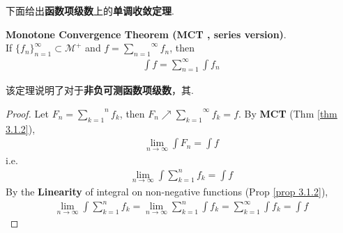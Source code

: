 	\newpage
	下面给出\textbf{函数项级数}上的\textbf{单调收敛定理}.
	\begin{thm}\label{thm 3.1.4}
		\textbf{Monotone Convergence Theorem (MCT , series version)}.\\
		If $\{ f_n \}_{n = 1}^{\infty} \subset \mathcal{M}^{+}$ and $f = \overset{\infty}{\underset{n = 1}{\sum}}{f_n}$, then
		\begin{align}
			\int{f} = \sum_{n = 1}^{\infty}{\int{f_n}}
		\end{align}
	
		\vspace{1em}
		\begin{rmk}
			该定理说明了对于\textbf{非负可测函数项级数}，其.
		\end{rmk}
	
		\vspace{1em}
		\begin{proof}
			Let $F_n = \overset{n}{\underset{k = 1}{\sum}}{f_k}$, then $F_n \nearrow \overset{\infty}{\underset{k = 1}{\sum}}{f_k} = f$. By \textbf{MCT} (Thm \ref{thm 3.1.2}),
			\begin{align}
				\lim_{n \to \infty}{\int{F_n}} = \int{f}
			\end{align}
			i.e.
			\begin{align}
				\lim_{n \to \infty}{\int{\sum_{k = 1}^{n}{f_k}}} = \int{f}
			\end{align}
			By the \textbf{Linearity} of integral on non-negative functions (Prop \ref{prop 3.1.2}),
			\begin{align}
				\lim_{n \to \infty}{\int{\sum_{k = 1}^{n}{f_k}}} = \lim_{n \to \infty}{\sum_{k = 1}^{n}{\int{f_k}}} = \sum_{k = 1}^{\infty}{\int{f_k}} = \int{f}
			\end{align}
		\end{proof}
	\end{thm}



	\ifx\allfiles\undefined

\fi
